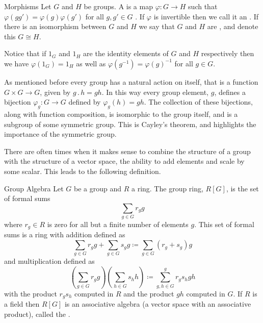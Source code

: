 \documentclass[fleqn]{NotesClass}
\newcommand{\identity}{1}
\newcommand{\action}{\mathbin{.}}
\newcommand{\isomorphic}{\cong}
\begin{document}
    \begin{dfn}{Morphisms}{}
        Let \(G\) and \(H\) be groups.
        A  is a map \(\varphi \colon G \to H\) such that \(\varphi(gg') = \varphi(g)\varphi(g')\) for all \(g, g' \in G\) \cite[705]{hassani}.
        If \(\varphi\) is invertible then we call it an .
        If there is an isomorphism between \(G\) and \(H\) we say that \(G\) and \(H\) are , and denote this \(G \isomorphic H\).
    \end{dfn}
    
    Notice that if \(\identity_G\) and \(\identity_H\) are the identity elements of \(G\) and \(H\) respectively then we have \(\varphi(\identity_G) = \identity_H\) as well as \(\varphi(g^{-1}) = \varphi(g)^{-1}\) for all \(g \in G\).
    
    As mentioned before every group has a natural action on itself, that is a function \(G \times G \to G\), given by \(g \action h = gh\).
    In this way every group element, \(g\), defines a bijection \(\varphi_g \colon G \to G\) defined by \(\varphi_g(h) = gh\).
    The collection of these bijections, along with function composition, is isomorphic to the group itself, and is a subgroup of some symmetric group.
    This is Cayley's theorem, and highlights the importance of the symmetric group.
    
    There are often times when it makes sense to combine the structure of a group with the structure of a vector space, the ability to add elements and scale by some scalar.
    This leads to the following definition.
    
    \begin{dfn}{Group Algebra}{}
        Let \(G\) be a group and \(R\) a ring.
        The group ring, \(R[G]\), is the set of formal sums
        \begin{equation}
            \sum_{g \in G} r_g g
        \end{equation}
        where \(r_g \in R\) is zero for all but a finite number of elements \(g\).
        This set of formal sums is a ring with addition defined as
        \begin{equation}
            \sum_{g \in G} r_g g + \sum_{g \in G} s_g g \coloneqq \sum_{g\in G}(r_g + s_g) g
        \end{equation}
        and multiplication defined as
        \begin{equation}
            \left( \sum_{g \in G} r_g g \right) \left( \sum_{h \in G} s_h h \right) \coloneqq \sum_{g, h \in G}^{g} r_g s_h gh
        \end{equation}
        with the product \(r_gs_h\) computed in \(R\) and the product \(gh\) computed in \(G\).
        If \(R\) is a field then \(R[G]\) is an associative algebra (a vector space with an associative product), called the  \cite[740]{hassani}.
    \end{dfn}
    
\end{document}
